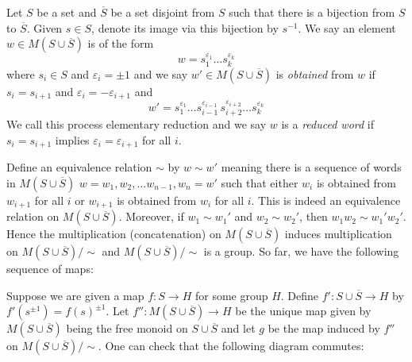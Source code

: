\documentclass[twoside]{report}
\newcommand{\eps}{\varepsilon}
\newcounter{Lecture}
\theoremstyle{myts}
\newcounter{c}[Lecture]
\newenvironment{prf}{
  \noindent\begin{mdframed}[style=prf]}{\end{mdframed} \vspace{1em}
}
\begin{document}
\begin{prf}
  Let $S$ be a set and \(\overline{S}\) be a set disjoint from $S$ such that there is a bijection from $S$ to $\overline{S}$. Given \(s\in S\), denote its image via this bijection by \(s^{-1}\). We say an element \(  w \in M(S\cup\overline{S}) \) is of the form
  \[
    w = s_1^{\eps_1} \ldots s_k^{\eps_k}
  \]
  where \( s_i \in S \) and \( \eps_i = \pm 1 \) and we say \( w' \in M(S\cup\overline{S}) \) is \emph{obtained} from $w$ if \(s_i = s_{i+1}\) and \( \eps_i = -\eps_{i+1} \) and
  \[
    w' = s_1^{\eps_1} \ldots s_{i-1}^{\eps_{i-1}} \, s_{i+2}^{\eps_{i+2}} \ldots s_k^{\eps_k}
  \]
  We call this process elementary reduction and we say $w$ is a \emph{reduced word} if \( s_i = s_{i+1} \) implies \( \eps_i = \eps_{i+1} \) for all $i$.

  Define an equivalence relation $\sim$ by \( w\sim w' \) meaning there is a sequence of words in \( M(S\cup\overline{S}) \) \( w = w_1, w_2 , \ldots w_{n-1}, w_n = w' \) such that either $w_i$ is obtained from $w_{i+1}$ for all $i$ or $w_{i+1}$ is obtained from $w_i$ for all $i$. This is indeed an equivalence relation on \(M(S\cup\overline{S})\). Moreover, if \( w_1 \sim w_1' \) and \( w_2 \sim w_2' \), then \( w_1 w_2 \sim w_1'w_2' \). Hence the multiplication (concatenation) on \(M(S\cup\overline{S})\) induces multiplication on \(M(S\cup\overline{S})/\sim\) and \(M(S\cup\overline{S})/\sim\) is a group. So far, we have the following sequence of maps:
  \begin{center}
  \end{center}
  Suppose we are given a map \( f: S\to H \) for some group $H$. Define \( f' : S\cup\overline{S} \to H \) by \(f'(s^{\pm 1}) = f(s)^{\pm 1}\). Let \(f'' : M(S\cup\overline{S}) \to H \) be the unique map given by $M(S\cup\overline{S})$ being the free monoid on $S\cup\overline{S}$ and let $g$ be the map induced by $f''$ on $M(S\cup\overline{S})/\sim$. One can check that the following diagram commutes:
  \begin{center}
  \end{center}
\end{prf}
\end{document}
